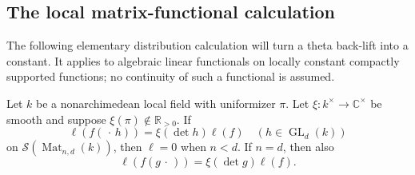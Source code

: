 \subsection{The local matrix-functional calculation}

The following elementary distribution calculation will turn a
theta back-lift into a constant. It applies to algebraic linear
functionals on locally constant compactly supported functions;
no continuity of such a functional is assumed.

\begin{srlemma}
Let \(k\) be a nonarchimedean local field with uniformizer \(\pi\).
Let \(\xi:k^\times\to\mathbb C^\times\) be smooth and suppose
\(\xi(\pi)\notin\mathbb R_{>0}\).
If
\[
 \ell(f(\,\cdot\,h))=\xi(\det h)\ell(f)
       \quad(h\in\operatorname{GL}_d(k))
\]
on \(\mathcal S(\operatorname{Mat}_{n,d}(k))\), then
\(\ell=0\) when \(n<d\). If \(n=d\), then also
\[
                \ell(f(g\,\cdot\,))=\xi(\det g)\ell(f).
\]
\end{srlemma}


